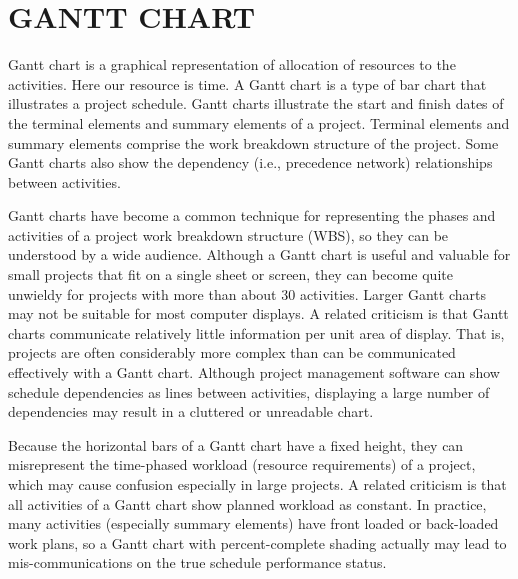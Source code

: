 \documentclass[12pt,a4paper,oneside]{report}
\begin{document}
{\section{GANTT CHART} 
\par Gantt chart is a graphical representation of allocation of resources to the activities. Here
our resource is time. A Gantt chart is a type of bar chart that illustrates a project schedule.
Gantt charts illustrate the start and finish dates of the terminal elements and summary elements
of a project. Terminal elements and summary elements comprise the work breakdown structure
of the project. Some Gantt charts also show the dependency (i.e., precedence network)
relationships between activities.
\par Gantt charts have become a common technique for representing the phases and activities
of a project work breakdown structure (WBS), so they can be understood by a wide audience.
Although a Gantt chart is useful and valuable for small projects that fit on a single sheet or
screen, they can become quite unwieldy for projects with more than about 30 activities. Larger
Gantt charts may not be suitable for most computer displays. A related criticism is that Gantt
charts communicate relatively little information per unit area of display. That is, projects are
often considerably more complex than can be communicated effectively with a Gantt chart.
Although project management software can show schedule dependencies as lines between activities,
displaying a large number of dependencies may result in a cluttered or unreadable
chart.
\par Because the horizontal bars of a Gantt chart have a fixed height, they can misrepresent
the time-phased workload (resource requirements) of a project, which may cause confusion especially
in large projects. A related criticism is that all activities of a Gantt chart show planned
workload as constant. In practice, many activities (especially summary elements) have front loaded
or back-loaded work plans, so a Gantt chart with percent-complete shading actually may
lead to mis-communications on the true schedule performance status.
\newpage
\begin{figure}[h]
\begin{center}

\end{center}
\end{figure}}
\end{document}
